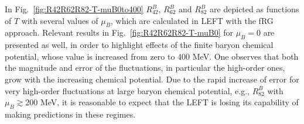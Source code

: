 \documentclass[%
reprint,
superscriptaddress,
showpacs,preprintnumbers,
 amsmath,amssymb,
 aps,
prd,
]{revtex4-1}
\def\Fig#1{Fig.~\ref{#1}} \def\Tab#1{Tab.~\ref{#1}}
\begin{document}
In \Fig{fig:R42R62R82-T-muB0to400} $R^{B}_{42}$, $R^{B}_{62}$ and $R^{B}_{82}$ are depicted as functions of $T$ with several values of $\mu_B$, which are calculated in LEFT with the fRG approach. Relevant results in \Fig{fig:R42R62R82-T-muB0} for $\mu_B=0$ are presented as well, in order to highlight effects of the finite baryon chemical potential, whose value is increased from zero to 400 MeV. One observes that both the magnitude and error of the fluctuations, in particular the high-order ones, grow with the increasing chemical potential. Due to the rapid increase of error for very high-order fluctuations at large baryon chemical potential, e.g., $R^{B}_{82}$ with $\mu_B\gtrsim 200$ MeV, it is reasonable to expect that the LEFT is losing its capability of making predictions in these regimes.

\end{document}
